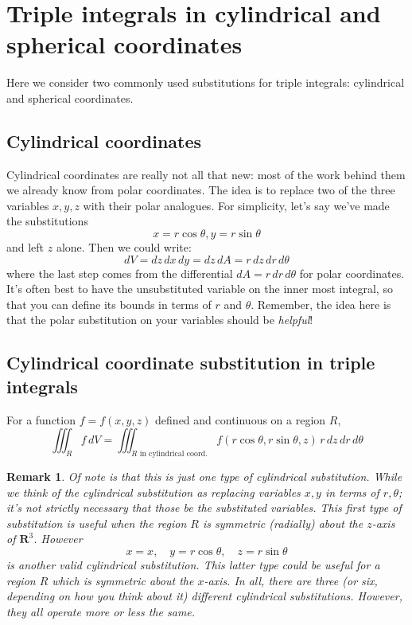 \documentclass[12pt]{article}
\numberwithin{equation}{subsection}
\numberwithin{figure}{subsection}
\theoremstyle{note}
\newtheorem{remark}[subsection]{Remark}
\begin{document}
{\section[Cylindrical and spherical coordinates]{Triple integrals in cylindrical and spherical coordinates}

Here we consider two commonly used substitutions for triple integrals: cylindrical and spherical coordinates.

\subsection{Cylindrical coordinates}
Cylindrical coordinates are really not all that new: most of the work behind them we already know from polar coordinates. The idea is to replace two of the three variables $x,y,z$ with their polar analogues. For simplicity, let's say we've made the substitutions \[ x=r\cos \theta, y=r\sin \theta\] and left $z$ alone. Then we could write: \begin{equation} \label{cyl-sub} dV=dz \,dx\,dy=dz\, dA=r \,dz \,dr\,d\theta\end{equation} 
where the last step comes from the differential $dA=r \,dr\,d\theta$ for polar coordinates. It's often best to have the unsubstituted variable on the inner most integral, so that you can define its bounds in terms of $r$ and $\theta$. Remember, the idea here is that the polar substitution on your variables should be \textit{helpful}!

\subsection{Cylindrical coordinate substitution in triple integrals} For a function $f=f(x,y,z)$ defined and continuous on a region $R$, \begin{equation}\iiint_R f\,dV=\iiint_{\text{$R$ in cylindrical coord.}} f(r\cos\theta,r\sin\theta,z)\, r \,dz  \,dr \, d\theta \end{equation}

\begin{remark}
	Of note is that this is just \textit{one} type of cylindrical substitution. While we think of the cylindrical substitution as replacing variables $x,y$ in terms of $r,\theta$; it's not strictly necessary that those be the substituted variables. This first type of substitution is useful when the region $R$ is symmetric (radially) about the $z$-axis of $\mathbf{R}^3$. However \[x=x,\quad y=r\cos\theta,\quad  z=r\sin\theta\] is another valid cylindrical substitution. This latter type could be useful for a region $R$ which is symmetric about the $x$-axis. In all, there are three (or six, depending on how you think about it) different cylindrical substitutions. However, they all operate more or less the same.
\end{remark}


}
\end{document}

